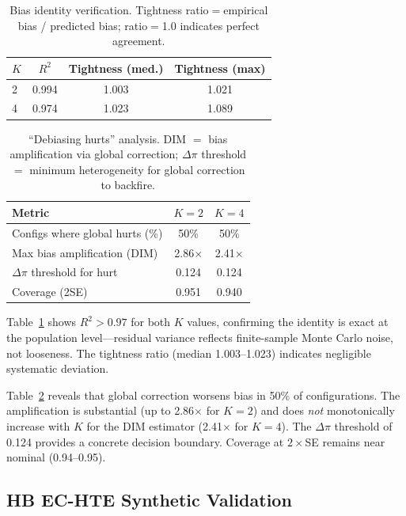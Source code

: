 \documentclass[11pt,twocolumn]{article}
\begin{document}
\begin{table}[t]
\centering
\small
\caption{Bias identity verification. Tightness ratio$=$empirical bias / predicted bias; ratio$=$1.0 indicates perfect agreement.}
\label{tab:identity}
\begin{tabular}{@{}lccc@{}}
\toprule
$K$ & $R^2$ & Tightness (med.) & Tightness (max) \\
\midrule
2 & 0.994 & 1.003 & 1.021 \\
4 & 0.974 & 1.023 & 1.089 \\
\bottomrule
\end{tabular}
\end{table}

\begin{table}[t]
\centering
\small
\caption{``Debiasing hurts'' analysis. DIM $=$ bias amplification via global correction; $\Delta\pi$ threshold $=$ minimum heterogeneity for global correction to backfire.}
\label{tab:hurts}
\begin{tabular}{@{}lcc@{}}
\toprule
Metric & $K{=}2$ & $K{=}4$ \\
\midrule
Configs where global hurts (\%) & 50\% & 50\% \\
Max bias amplification (DIM) & 2.86$\times$ & 2.41$\times$ \\
$\Delta\pi$ threshold for hurt & 0.124 & 0.124 \\
Coverage (2SE) & 0.951 & 0.940 \\
\bottomrule
\end{tabular}
\end{table}

Table~\ref{tab:identity} shows $R^2 > 0.97$ for both $K$ values, confirming the identity is exact at the population level---residual variance reflects finite-sample Monte Carlo noise, not looseness.  The tightness ratio (median 1.003--1.023) indicates negligible systematic deviation.

Table~\ref{tab:hurts} reveals that global correction worsens bias in 50\% of configurations. The amplification is substantial (up to 2.86$\times$ for $K{=}2$) and does \emph{not} monotonically increase with $K$ for the DIM estimator (2.41$\times$ for $K{=}4$). The $\Delta\pi$ threshold of 0.124 provides a concrete decision boundary. Coverage at $2\times$SE remains near nominal (0.94--0.95).

\subsection{HB EC-HTE Synthetic Validation}
\label{sec:synthetic}
\end{document}
